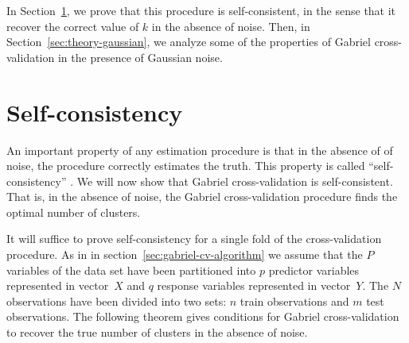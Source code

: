 \documentclass[12pt]{article}
\begin{document}
In Section~\ref{sec:self-consistent}, we prove that this procedure is
self-consistent, in the sense that it recover the correct value of $k$ in the
absence of noise. Then, in Section~\ref{sec:theory-gaussian}, we analyze some
of the properties of Gabriel cross-validation in the presence of Gaussian
noise.


\section{Self-consistency}
\label{sec:self-consistent}

An important property of any estimation procedure is that in the absence of of
noise, the procedure correctly estimates the truth. This property is called
``self-consistency'' \citep{tarpey96}. We will now show that Gabriel
cross-validation is self-consistent. That is, in the absence of noise, the
Gabriel cross-validation procedure finds the optimal number of clusters.


It will suffice to prove self-consistency for a single fold of the
cross-validation procedure.  As in in section~\ref{sec:gabriel-cv-algorithm}
we assume that the $P$ variables of the data set have been partitioned into
$p$ predictor variables represented in vector~$X$ and $q$ response variables
represented in vector~$Y$.  The $N$ observations have been divided into two
sets: $n$ train observations and $m$ test observations.  The following theorem
gives conditions for Gabriel cross-validation to recover the true number of
clusters in the absence of noise.
\end{document}

